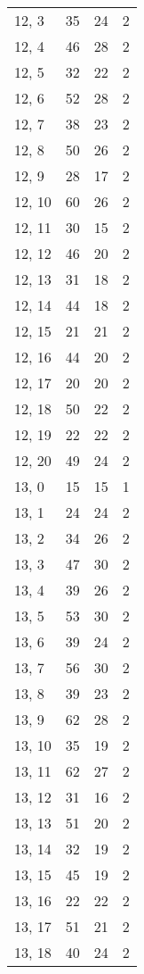 \begin{table}
\begin{tabular}{llll}
12, 3  &   35 &   24 &     2 \\
12, 4  &   46 &   28 &     2 \\
12, 5  &   32 &   22 &     2 \\
12, 6  &   52 &   28 &     2 \\
12, 7  &   38 &   23 &     2 \\
12, 8  &   50 &   26 &     2 \\
12, 9  &   28 &   17 &     2 \\
12, 10 &   60 &   26 &     2 \\
12, 11 &   30 &   15 &     2 \\
12, 12 &   46 &   20 &     2 \\
12, 13 &   31 &   18 &     2 \\
12, 14 &   44 &   18 &     2 \\
12, 15 &   21 &   21 &     2 \\
12, 16 &   44 &   20 &     2 \\
12, 17 &   20 &   20 &     2 \\
12, 18 &   50 &   22 &     2 \\
12, 19 &   22 &   22 &     2 \\
12, 20 &   49 &   24 &     2 \\
13, 0  &   15 &   15 &     1 \\
13, 1  &   24 &   24 &     2 \\
13, 2  &   34 &   26 &     2 \\
13, 3  &   47 &   30 &     2 \\
13, 4  &   39 &   26 &     2 \\
13, 5  &   53 &   30 &     2 \\
13, 6  &   39 &   24 &     2 \\
13, 7  &   56 &   30 &     2 \\
13, 8  &   39 &   23 &     2 \\
13, 9  &   62 &   28 &     2 \\
13, 10 &   35 &   19 &     2 \\
13, 11 &   62 &   27 &     2 \\
13, 12 &   31 &   16 &     2 \\
13, 13 &   51 &   20 &     2 \\
13, 14 &   32 &   19 &     2 \\
13, 15 &   45 &   19 &     2 \\
13, 16 &   22 &   22 &     2 \\
13, 17 &   51 &   21 &     2 \\
13, 18 &   40 &   24 &     2 \\

\end{tabular}
\end{table}
